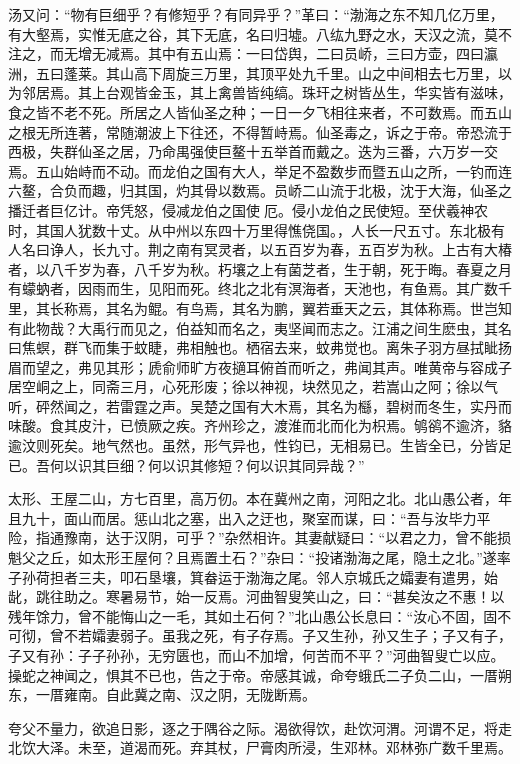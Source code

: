 \documentclass[]{article}
\begin{document}
汤又问：``物有巨细乎？有修短乎？有同异乎？''革曰：``渤海之东不知几亿万里，有大壑焉，实惟无底之谷，其下无底，名曰归墟。八纮九野之水，天汉之流，莫不注之，而无增无减焉。其中有五山焉：一曰岱舆，二曰员峤，三曰方壶，四曰瀛洲，五曰蓬莱。其山高下周旋三万里，其顶平处九千里。山之中间相去七万里，以为邻居焉。其上台观皆金玉，其上禽兽皆纯缟。珠玕之树皆丛生，华实皆有滋味，食之皆不老不死。所居之人皆仙圣之种；一日一夕飞相往来者，不可数焉。而五山之根无所连著，常随潮波上下往还，不得暂峙焉。仙圣毒之，诉之于帝。帝恐流于西极，失群仙圣之居，乃命禺强使巨鳌十五举首而戴之。迭为三番，六万岁一交焉。五山始峙而不动。而龙伯之国有大人，举足不盈数步而暨五山之所，一钓而连六鳌，合负而趣，归其国，灼其骨以数焉。员峤二山流于北极，沈于大海，仙圣之播迁者巨亿计。帝凭怒，侵减龙伯之国使厄。侵小龙伯之民使短。至伏羲神农时，其国人犹数十丈。从中州以东四十万里得憔侥国。，人长一尺五寸。东北极有人名曰诤人，长九寸。荆之南有冥灵者，以五百岁为春，五百岁为秋。上古有大椿者，以八千岁为春，八千岁为秋。朽壤之上有菌芝者，生于朝，死于晦。春夏之月有蠓蚋者，因雨而生，见阳而死。终北之北有溟海者，天池也，有鱼焉。其广数千里，其长称焉，其名为鲲。有鸟焉，其名为鹏，翼若垂天之云，其体称焉。世岂知有此物哉？大禹行而见之，伯益知而名之，夷坚闻而志之。江浦之间生麽虫，其名曰焦螟，群飞而集于蚊睫，弗相触也。栖宿去来，蚊弗觉也。离朱子羽方昼拭眦扬眉而望之，弗见其形；虒俞师旷方夜擿耳俯首而听之，弗闻其声。唯黄帝与容成子居空峒之上，同斋三月，心死形废；徐以神视，块然见之，若嵩山之阿；徐以气听，砰然闻之，若雷霆之声。吴楚之国有大木焉，其名为櫾，碧树而冬生，实丹而味酸。食其皮汁，已愤厥之疾。齐州珍之，渡淮而北而化为枳焉。鸲鹆不逾济，貉逾汶则死矣。地气然也。虽然，形气异也，性钧已，无相易已。生皆全已，分皆足已。吾何以识其巨细？何以识其修短？何以识其同异哉？''

太形、王屋二山，方七百里，高万仞。本在冀州之南，河阳之北。北山愚公者，年且九十，面山而居。惩山北之塞，出入之迂也，聚室而谋，曰：``吾与汝毕力平险，指通豫南，达于汉阴，可乎？''杂然相许。其妻献疑曰：``以君之力，曾不能损魁父之丘，如太形王屋何？且焉置土石？''杂曰：``投诸渤海之尾，隐土之北。''遂率子孙荷担者三夫，叩石垦壤，箕畚运于渤海之尾。邻人京城氏之孀妻有遣男，始龀，跳往助之。寒暑易节，始一反焉。河曲智叟笑山之，曰：``甚矣汝之不惠！以残年馀力，曾不能悔山之一毛，其如土石何？''北山愚公长息曰：``汝心不固，固不可彻，曾不若孀妻弱子。虽我之死，有子存焉。子又生孙，孙又生子；子又有子，子又有孙：子子孙孙，无穷匮也，而山不加增，何苦而不平？''河曲智叟亡以应。操蛇之神闻之，惧其不已也，告之于帝。帝感其诚，命夸蛾氏二子负二山，一厝朔东，一厝雍南。自此冀之南、汉之阴，无陇断焉。

夸父不量力，欲追日影，逐之于隅谷之际。渴欲得饮，赴饮河渭。河谓不足，将走北饮大泽。未至，道渴而死。弃其杖，尸膏肉所浸，生邓林。邓林弥广数千里焉。
\end{document}
